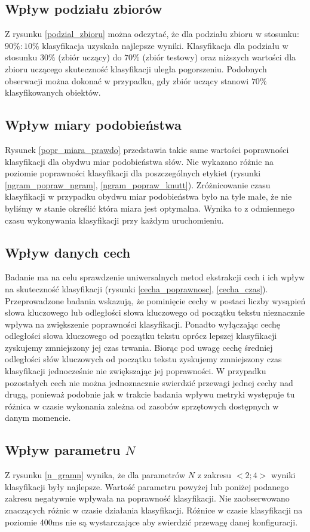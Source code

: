 \documentclass{classrep}
\begin{document}
\subsection{Wpływ podziału zbiorów}
Z rysunku \ref{podzial_zbioru} można odczytać, że dla podziału zbioru w stosunku: $90\%:10\%$ klasyfikacja
uzyskała najlepsze wyniki.
Klasyfikacja dla podziału w stosunku $30\%$ (zbiór uczący) do $70\%$ (zbiór testowy) oraz niższych wartości dla zbioru uczącego
skuteczność klasyfikacji uległa pogorszeniu. Podobnych obserwacji można dokonać w przypadku, gdy
zbiór uczący stanowi $70\%$
klasyfikowanych obiektów.

\subsection{Wpływ miary podobieństwa}
Rysunek \ref{popr_miara_prawdo} przedstawia takie same wartości poprawności klasyfikacji dla obydwu
miar podobieństwa słów. Nie wykazano różnic na poziomie poprawności klasyfikacji dla poszczególnych
etykiet (rysunki \ref{ngram_popraw_ngram}, \ref{ngram_popraw_knutt}). Zróżnicowanie czasu klasyfikacji
w przypadku obydwu miar podobieństwa było na tyle małe, że nie byliśmy w stanie określić która
miara jest optymalna. Wynika to z odmiennego czasu wykonywania klasyfikacji przy każdym uruchomieniu.

\subsection{Wpływ danych cech}
Badanie ma na celu sprawdzenie uniwersalnych metod ekstrakcji cech i ich wpływ na skuteczność
klasyfikacji (rysunki \ref{cecha_poprawnosc}, \ref{cecha_czas}). Przeprowadzone badania wskazują,
że pominięcie cechy w postaci liczby wysąpień słowa kluczowego lub odległości słowa kluczowego od początku tekstu
nieznacznie wpływa na zwiększenie poprawności klasyfikacji. Ponadto wyłączając cechę odległości słowa
kluczowego od początku tekstu oprócz lepszej klasyfikacji zyskujemy zmniejszony jej czas trwania.
Biorąc pod uwagę cechę średniej odległości słów kluczowych od początku tekstu zyskujemy zmniejszony
czas klasyfikacji jednocześnie nie zwiększając jej poprawności. W przypadku pozostałych cech nie można
jednoznacznie swierdzić przewagi jednej cechy nad drugą, ponieważ podobnie jak w trakcie badania wpływu
metryki występuje tu różnica w czasie wykonania zależna od zasobów sprzętowych dostępnych w danym momencie.

\subsection{Wpływ parametru $N$}
Z rysunku \ref{n_gramn} wynika, że dla parametrów $N$ z zakresu $<2;4>$ wyniki klasyfikacji były najlepsze.
Wartość parametru powyżej lub poniżej podanego zakresu negatywnie wpływała na poprawność klasyfikacji.
Nie zaobserwowano znaczących różnic w czasie działania klasyfikacji. Różnice w czasie klasyfikacji
na poziomie 400ms nie są wystarczające aby swierdzić przewagę danej konfiguracji.
\end{document}
